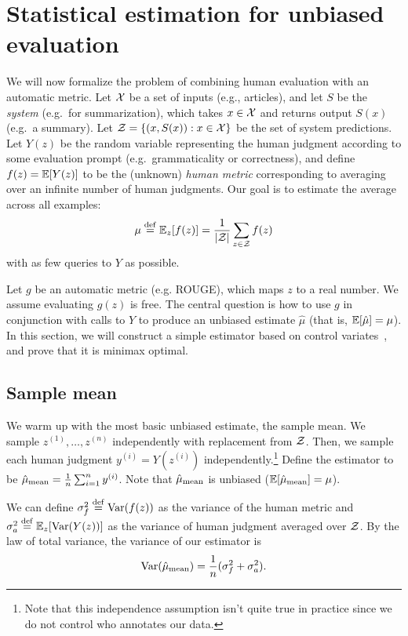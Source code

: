 \section{Statistical estimation for unbiased evaluation}
\label{sec:method}

We will now formalize the problem of combining human evaluation with an automatic metric.
Let $\mathcal{X}$ be a set of inputs (e.g., articles),
and let $S$ be the \emph{system} (e.g.\ for summarization),
which takes $x \in \mathcal{X}$ and returns output $S(x)$ (e.g.\ a summary).
Let $\mathcal{Z} = \{ (x, S(x)) : x \in \mathcal{X} \}$ be the set of system predictions.
Let $Y(z)$ be the random variable representing the human judgment according to some evaluation prompt (e.g.\ grammaticality or correctness),
and define $f(z) = \mathbb{E}[Y(z)]$ to be the (unknown) \emph{human metric} corresponding to averaging over an infinite number of human judgments.
Our goal is to estimate the average across all examples:
\begin{align}
\mu \stackrel{\rm def}{=} \mathbb{E}_z[f(z)] = \frac{1}{|\mathcal{Z}|} \sum_{z \in \mathcal{Z}} f(z)
\end{align}
with as few queries to $Y$ as possible.

Let $g$ be an automatic metric (e.g. ROUGE), which maps $z$ to a real number.
We assume evaluating $g(z)$ is free.
The central question is how to use $g$ in conjunction with calls to $Y$ to produce an unbiased estimate $\hat\mu$ (that is, $\mathbb{E}[\hat\mu] = \mu$).
In this section, we will construct a simple estimator based on control variates~\citep{ripley2009stochastic},
and prove that it is minimax optimal.





\subsection{Sample mean}

We warm up with the most basic unbiased estimate, the sample mean.
We sample $z^{(1)}, \dots, z^{(n)}$ independently with replacement from $\mathcal{Z}$.
Then, we sample each human judgment $y^{(i)} = Y(z^{(i)})$ independently.\footnote{%
Note that this independence assumption isn't quite true in practice since we do not control who annotates our data.}
Define the estimator to be $\hat \mu_\text{mean} = \frac{1}{n} \sum_{i=1}^n y^{(i)}$.
Note that $\hat \mu_\text{mean}$ is unbiased ($\mathbb{E}[\hat \mu_\text{mean}] = \mu$).

We can define $\sigma^2_f \stackrel{\rm def}{=} \operatorname{Var}(f(z))$ as the variance of the human metric
and $\sigma^2_a \stackrel{\rm def}{=} \mathbb{E}_z[\operatorname{Var}(Y(z))]$ as the variance of human judgment averaged over $\mathcal{Z}$.
By the law of total variance, the variance of our estimator
is
\begin{align}
\label{eqn:varsimple}
\operatorname{Var}(\hat \mu_\text{mean}) = \frac{1}{n} (\sigma^2_f + \sigma^2_a).
\end{align}

